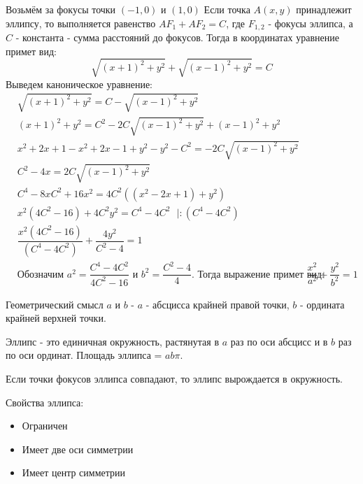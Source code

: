 \documentclass[12pt]{article}
\begin{document}
\begin{sloppypar}
    Возьмём за фокусы точки $(-1, 0)$ и $(1, 0)$ Если точка $A(x, y)$ принадлежит эллипсу, то выполняется равенство $AF_1 + AF_2 = C$, где $F_{1,2}$ - фокусы эллипса, а $C$ - константа - сумма расстояний до фокусов. Тогда в координатах уравнение примет вид:
    \[
        \sqrt{(x + 1)^2 + y^2} + \sqrt{(x - 1)^2 + y^2} = C
    \]
    Выведем каноническое уравнение:
    \begin{align*}
         & \sqrt{(x + 1)^2 + y^2} = C - \sqrt{(x - 1)^2 + y^2}                                                              \\
         & (x + 1)^2 + y^2 = C^2 - 2C\sqrt{(x - 1)^2 + y^2} + (x - 1)^2 + y^2                                               \\
         & x^2 + 2x + 1 - x^2 + 2x - 1 + y^2 - y^2 - C^2  = -2C\sqrt{(x - 1)^2 + y^2}                                       \\
         & C^2 - 4x = 2C\sqrt{(x - 1)^2 + y^2}                                                                              \\
         & C^4 - 8xC^2 + 16x^2 = 4C^2((x^2 - 2x + 1) + y^2)                                                                 \\
         & x^2(4C^2 - 16) + 4C^2y^2 = C^4 - 4C^2 \ \ \ | : (C^4 - 4C^2)                                                     \\
         & \dfrac{x^2 (4C^2 - 16)}{(C^4 - 4C^2)} + \dfrac{4y^2}{C^2 - 4} = 1                                                \\
         & \text{Обозначим $a^2 = \dfrac{C^4 - 4C^2}{4C^2 - 16}$ и $b^2 = \dfrac{C^2 - 4}{4}$. Тогда выражение примет вид:}
         & \dfrac{x^2}{a^2} + \dfrac{y^2}{b^2} = 1
    \end{align*}

    Геометрический смысл $a$ и $b$ - $a$ - абсцисса крайней правой точки, $b$ - ордината крайней верхней точки.

    Эллипс - это единичная окружность, растянутая в $a$ раз по оси абсцисс и в $b$ раз по оси ординат. Площадь эллипса = $ab\pi$.

    Если точки фокусов эллипса совпадают, то эллипс вырождается в окружность.

    Свойства эллипса:
    \begin{itemize}
        \item Ограничен
        \item Имеет две оси симметрии
        \item Имеет центр симметрии
    \end{itemize}


\end{sloppypar}
\end{document}
